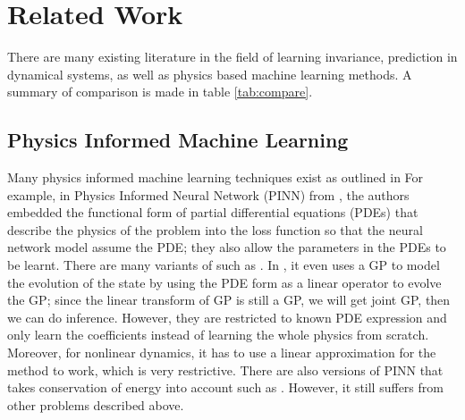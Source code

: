 \documentclass{statsmsc}
\begin{document}
\section{Related Work}
There are many existing literature in the field of learning invariance, prediction in dynamical systems, as well as physics based machine learning methods.
A summary of comparison is made in table \ref{tab:compare}.

\subsection{Physics Informed Machine Learning}
Many physics informed machine learning techniques exist as outlined in \cite{Cuomo2022, PIML}
For example, in Physics Informed Neural Network (PINN) from \cite{Raissi2019}, the authors embedded the functional form of partial differential equations (PDEs) that describe the physics of the problem into the loss function so that the neural network model assume the PDE; they also allow the parameters in the PDEs to be learnt. 
There are many variants of such as \cite{Qian2020}.
In \cite{Raissi2018}, it even uses a GP to model the evolution of the state by using the PDE form as a linear operator to evolve the GP; since the linear transform of GP is still a GP, we will get joint GP, then we can do inference.
However, they are restricted to known PDE expression and only learn the coefficients instead of learning the whole physics from scratch. 
Moreover, for nonlinear dynamics, it has to use a linear approximation for the method to work, which is very restrictive.
There are also versions of PINN that takes conservation of energy into account such as \cite{Jagtap2020}.
However, it still suffers from other problems described above.
\end{document}
